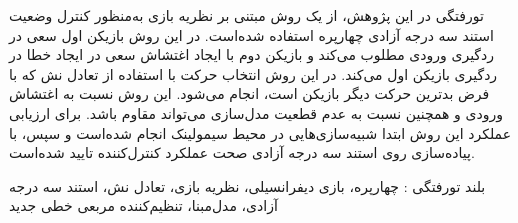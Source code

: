 


\pagestyle{empty}

\begin{وسط‌چین}
\end{وسط‌چین}

‌تورفتگی در این پژوهش، از یک روش مبتنی بر نظریه بازی به‌منظور کنترل وضعیت استند سه درجه آزادی چهارپره استفاده شده‌است. 
در این روش بازیکن اول سعی در ردگیری ورودی مطلوب می‌کند و بازیکن دوم با ایجاد اغتشاش سعی در ایجاد خطا  در ردگیری بازیکن اول می‌کند.
در این روش انتخاب حرکت با استفاده از تعادل نش که با فرض بدترین حرکت دیگر بازیکن است،  انجام می‌شود.
این روش نسبت به اغتشاش ورودی و همچنین نسبت به عدم قطعیت مدل‌سازی  می‌تواند مقاوم باشد.
برای ارزیابی عملکرد این روش ابتدا شبیه‌سازی‌هایی در محیط سیمولینک انجام شده‌است و سپس، با پیاده‌سازی روی استند سه درجه آزادی صحت عملکرد کنترل‌کننده تایید شده‌است. 

‌بلند
‌تورفتگی : 
چهارپره،  بازی دیفرانسیلی، نظریه بازی، تعادل نش، استند سه درجه آزادی، مدل‌مبنا، تنظیم‌کننده مربعی خطی 
‌جدید
